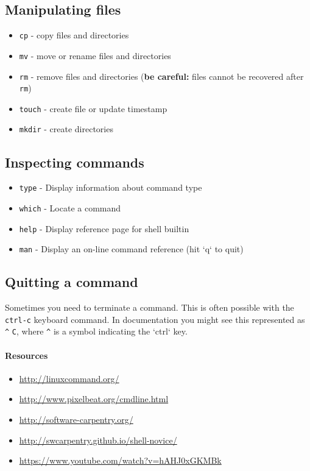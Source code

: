 \documentclass[12pt,letterpaper,twoside]{article}
\begin{document}
\subsection{Manipulating files}
\begin{itemize}
\item \texttt{cp} - copy files and directories
\item \texttt{mv} - move or rename files and directories
\item \texttt{rm} - remove files and directories
  (\textbf{be careful:} files cannot be recovered after \texttt{rm})
\item \texttt{touch} - create file or update timestamp
\item \texttt{mkdir} - create directories
\end{itemize}

\subsection{Inspecting commands}

\begin{itemize}
\item \texttt{type} - Display information about command type
\item \texttt{which} - Locate a command
\item \texttt{help} - Display reference page for shell builtin
\item \texttt{man} - Display an on-line command reference (hit `q` to quit)
\end{itemize}

\subsection{Quitting a command}

Sometimes you need to terminate a command.  This is often possible with the
\texttt{ctrl-c} keyboard command.  In documentation you might see this represented as \texttt{\^} \texttt{C}, where \texttt{\^} is a symbol indicating the `ctrl` key.

\paragraph{Resources}

\begin{multicols}{2}
\small
\begin{itemize}
\item \href{http://linuxcommand.org/}{http://linuxcommand.org/}
\item \href{http://www.pixelbeat.org/cmdline.html}{http://www.pixelbeat.org/cmdline.html}
\item \href{http://software-carpentry.org/}{http://software-carpentry.org/}
  \item \href{http://swcarpentry.github.io/shell-novice/}{http://swcarpentry.github.io/shell-novice/}
  \item \href{https://www.youtube.com/watch?v=hAHJ0xGKMBk}{https://www.youtube.com/watch?v=hAHJ0xGKMBk}
\end{itemize}
\end{multicols}
\end{document}
